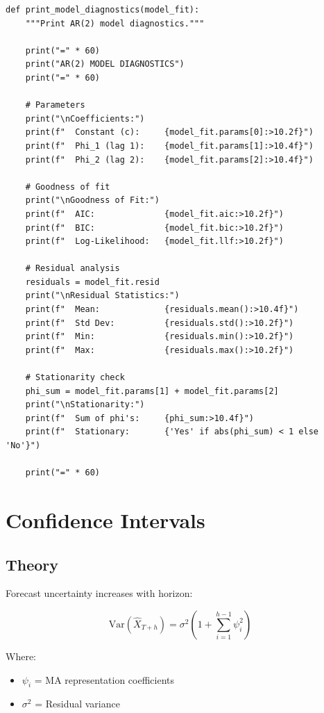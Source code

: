 \begin{lstlisting}[style=pythonstyle]
def print_model_diagnostics(model_fit):
    """Print AR(2) model diagnostics."""
    
    print("=" * 60)
    print("AR(2) MODEL DIAGNOSTICS")
    print("=" * 60)
    
    # Parameters
    print("\nCoefficients:")
    print(f"  Constant (c):     {model_fit.params[0]:>10.2f}")
    print(f"  Phi_1 (lag 1):    {model_fit.params[1]:>10.4f}")
    print(f"  Phi_2 (lag 2):    {model_fit.params[2]:>10.4f}")
    
    # Goodness of fit
    print("\nGoodness of Fit:")
    print(f"  AIC:              {model_fit.aic:>10.2f}")
    print(f"  BIC:              {model_fit.bic:>10.2f}")
    print(f"  Log-Likelihood:   {model_fit.llf:>10.2f}")
    
    # Residual analysis
    residuals = model_fit.resid
    print("\nResidual Statistics:")
    print(f"  Mean:             {residuals.mean():>10.4f}")
    print(f"  Std Dev:          {residuals.std():>10.2f}")
    print(f"  Min:              {residuals.min():>10.2f}")
    print(f"  Max:              {residuals.max():>10.2f}")
    
    # Stationarity check
    phi_sum = model_fit.params[1] + model_fit.params[2]
    print("\nStationarity:")
    print(f"  Sum of phi's:     {phi_sum:>10.4f}")
    print(f"  Stationary:       {'Yes' if abs(phi_sum) < 1 else 'No'}")
    
    print("=" * 60)
\end{lstlisting}

\section{Confidence Intervals}

\subsection{Theory}

Forecast uncertainty increases with horizon:

$$\text{Var}(\hat{X}_{T+h}) = \sigma^2 \left(1 + \sum_{i=1}^{h-1} \psi_i^2\right)$$

Where:
\begin{itemize}
    \item $\psi_i$ = MA representation coefficients
    \item $\sigma^2$ = Residual variance
\end{itemize}

